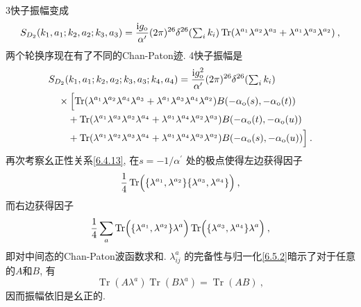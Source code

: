 3快子振幅变成
\begin{align}
	S_{D_{2}}(k_{1}, a_{1} ; k_{2}, a_{2} ; k_{3}, a_{3})= 
	 \frac{\mathrm{i} g_{\mathrm{o}}}{\alpha^{\prime}}(2 \pi)^{26} \delta^{26}({\textstyle\sum_{i} k_{i}}) 
	 \operatorname{Tr}(\lambda^{a_{1}} \lambda^{a_{2}} \lambda^{a_{3}}+\lambda^{a_{1}} \lambda^{a_{3}} \lambda^{a_{2}}) \:, \label{6.5.5}
\end{align}
两个轮换序现在有了不同的Chan-Paton迹. 4快子振幅是
	\begin{align}
		&S_{D_{2}}(k_{1}, a_{1} ; k_{2}, a_{2} ; k_{3}, a_{3} ; k_{4}, a_{4})
		=\frac{\mathrm{i} g_{\mathrm{o}}^{2}}{\alpha^{\prime}}(2 \pi)^{26} \delta^{26}({\textstyle \sum_{i} k_{i}}) \nonumber \\
		&\quad \times \Bigl[\operatorname{Tr}(\lambda^{a_{1}} \lambda^{a_{2}} \lambda^{a_{4}} \lambda^{a_{3}}
		+\lambda^{a_{1}} \lambda^{a_{3}} \lambda^{a_{4}} \lambda^{a_{2}}) B(-\alpha_{\mathrm{o}}(s),-\alpha_{\mathrm{o}}(t)) \nonumber  \\
		&\qquad+\operatorname{Tr}(\lambda^{a_{1}} \lambda^{a_{3}} \lambda^{a_{2}} \lambda^{a_{4}}
		+\lambda^{a_{1}} \lambda^{a_{4}} \lambda^{a_{2}} \lambda^{a_{3}}) B(-\alpha_{\mathrm{o}}(t),-\alpha_{\mathrm{o}}(u))\nonumber \\
		&\qquad+\operatorname{Tr}(\lambda^{a_{1}} \lambda^{a_{2}} \lambda^{a_{3}} \lambda^{a_{4}}
		+\lambda^{a_{1}} \lambda^{a_{4}} \lambda^{a_{3}} \lambda^{a_{2}}) 
		B(-\alpha_{\mathrm{o}}(s),-\alpha_{\mathrm{o}}(u))\Bigr] \:. \label{6.5.6}
	\end{align}
再次考察幺正性关系\eqref{6.4.13}, 在$s=-1 / \alpha^{\prime}$ 处的极点使得左边获得因子
\begin{equation}
	\frac{1}{4} \operatorname{Tr}\Bigl(\{\lambda^{a_{1}}, \lambda^{a_{2}}\} \{\lambda^{a_{3}}, \lambda^{a_{4}}\}\Bigr) \:,\label{6.5.7}
\end{equation}
而右边获得因子
\begin{equation}
	\frac{1}{4} \sum_{a} \operatorname{Tr}\Bigl(\{\lambda^{a_{1}}, \lambda^{a_{2}}\} \lambda^{a}\Bigr) 
	\operatorname{Tr}\Bigl(\{\lambda^{a_{3}}, \lambda^{a_{4}}\} \lambda^{a}\Bigr) \:, \label{6.5.8}
\end{equation}
即对中间态的Chan-Paton波函数求和.  $\lambda_{i j}^{a}$ 的完备性与归一化\eqref{6.5.2}暗示了对于任意的$A$和$B$, 有
\begin{equation}
	\operatorname{Tr}(A \lambda^{a}) \operatorname{Tr}(B \lambda^{a})=\operatorname{Tr}(A B) \:,  \label{6.5.9}
\end{equation}
因而振幅依旧是幺正的.

